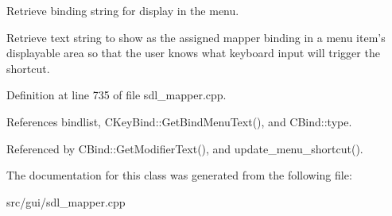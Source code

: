 Retrieve binding string for display in the menu. 

Retrieve text string to show as the assigned mapper binding in a menu item's displayable area so that the user knows what keyboard input will trigger the shortcut. 

Definition at line 735 of file sdl\-\_\-mapper.\-cpp.



References bindlist, C\-Key\-Bind\-::\-Get\-Bind\-Menu\-Text(), and C\-Bind\-::type.



Referenced by C\-Bind\-::\-Get\-Modifier\-Text(), and update\-\_\-menu\-\_\-shortcut().



The documentation for this class was generated from the following file\-:\begin{DoxyCompactItemize}
\item 
src/gui/sdl\-\_\-mapper.\-cpp\end{DoxyCompactItemize}
